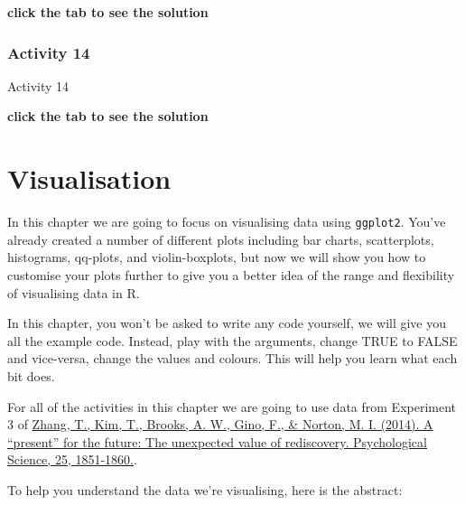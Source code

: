 \documentclass[]{book}
\newenvironment{Shaded}{\begin{snugshade}}{\end{snugshade}}
\newcommand{\DataTypeTok}[1]{\textcolor[rgb]{0.13,0.29,0.53}{#1}}
\newcommand{\KeywordTok}[1]{\textcolor[rgb]{0.13,0.29,0.53}{\textbf{#1}}}
\newcommand{\NormalTok}[1]{#1}
\newcommand{\OperatorTok}[1]{\textcolor[rgb]{0.81,0.36,0.00}{\textbf{#1}}}
\newcommand{\OtherTok}[1]{\textcolor[rgb]{0.56,0.35,0.01}{#1}}
\newcommand{\StringTok}[1]{\textcolor[rgb]{0.31,0.60,0.02}{#1}}
\begin{document}
\textbf{click the tab to see the solution}

\hypertarget{activity-14}{%
\subsection{Activity 14}\label{activity-14}}

Activity 14

\begin{Shaded}
\end{Shaded}

\textbf{click the tab to see the solution}

\hypertarget{vis}{%
\chapter{Visualisation}\label{vis}}

In this chapter we are going to focus on visualising data using \texttt{ggplot2}. You've already created a number of different plots including bar charts, scatterplots, histograms, qq-plots, and violin-boxplots, but now we will show you how to customise your plots further to give you a better idea of the range and flexibility of visualising data in R.

In this chapter, you won't be asked to write any code yourself, we will give you all the example code. Instead, play with the arguments, change TRUE to FALSE and vice-versa, change the values and colours. This will help you learn what each bit does.

For all of the activities in this chapter we are going to use data from Experiment 3 of \href{https://journals.sagepub.com/doi/abs/10.1177/0956797614542274}{Zhang, T., Kim, T., Brooks, A. W., Gino, F., \& Norton, M. I. (2014). A ``present'' for the future: The unexpected value of rediscovery. Psychological Science, 25, 1851-1860.}.

To help you understand the data we're visualising, here is the abstract:
\end{document}
